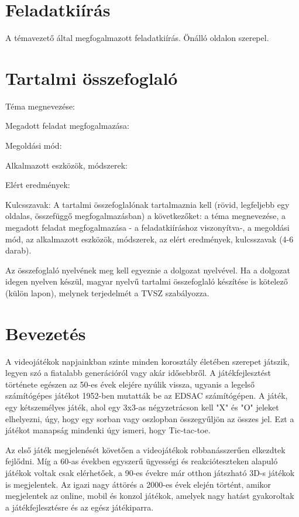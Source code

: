 \documentclass[12pt, a4paper]{report}
\theoremstyle{definition}
\begin{document}
	\chapter*{Feladatkiírás}

	A témavezető által megfogalmazott feladatkiírás. Önálló oldalon szerepel.

	\chapter*{Tartalmi összefoglaló}
	Téma megnevezése:
	
	Megadott feladat megfogalmazása:
	
	
	Megoldási mód:
	
	
	Alkalmazott eszközök, módszerek:
	
	
	Elért eredmények:
	
	
	Kulcsszavak:
	A tartalmi összefoglalónak tartalmaznia kell (rövid, legfeljebb egy oldalas, összefüggő megfogalmazásban)
	a következőket: a téma megnevezése, a megadott feladat megfogalmazása - a feladatkiíráshoz viszonyítva-,
	a megoldási mód, az alkalmazott eszközök, módszerek, az elért eredmények, kulcsszavak (4-6 darab).

	Az összefoglaló nyelvének meg kell egyeznie a dolgozat nyelvével. Ha a dolgozat idegen nyelven készül,
	magyar nyelvű tartalmi összefoglaló készítése is kötelező (külön lapon), melynek terjedelmét a TVSZ szabályozza.


	\chapter*{Bevezetés}
	A videojátékok napjainkban szinte minden korosztály életében szerepet játszik, legyen szó a fiatalabb generációról vagy akár idősebbről. A játékfejlesztést története egészen az 50-es évek elejére nyúlik vissza, ugyanis a legelső számítógépes játékot 1952-ben mutatták be az EDSAC számítógépen. A játék, egy kétszemélyes játék, ahol egy 3x3-as négyzetrácson kell "X" és "O" jeleket elhelyezni, úgy, hogy egy sorban vagy oszlopban összegyűljön az összes jel. Ezt a játékot manapság mindenki úgy ismeri, hogy Tic-tac-toe.
	
	Az első játék megjelenését követően a videojátékok robbanásszerűen elkezdtek fejlődni. Míg a 60-as években egyszerű ügyességi és reakcióteszteken alapuló játékok voltak csak elérhetőek, a 90-es évekre már otthon játszható 3D-s játékok is megjelentek. Az igazi nagy áttörés a 2000-es évek elején történt, amikor megjelentek az online, mobil és konzol játékok, amelyek nagy hatást gyakoroltak a játékfejlesztésre és az egész játékiparra.
	
\end{document}
